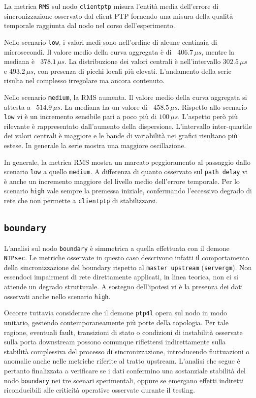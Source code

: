 La metrica \texttt{RMS} sul nodo \texttt{clientptp} misura l'entità media dell'errore
di sincronizzazione osservato dal client PTP fornendo una misura della qualità temporale
raggiunta dal nodo nel corso dell'esperimento.

Nello scenario \texttt{low}, i valori medi sono nell'ordine di alcune centinaia di
microsecondi. Il valore medio della curva aggregata è di ~$406.7\,\mu s$, mentre
la mediana è ~$378.1\,\mu s$. La distribuzione dei valori centrali è nell'intervallo
$3 02.5\,\mu s$ e $493.2\,\mu s$, con presenza di picchi locali più elevati.
L'andamento della serie risulta nel complesso irregolare ma ancora contenuto.

Nello scenario \texttt{medium}, la RMS aumenta. Il valore medio della curva aggregata
si attesta a ~$514.9\,\mu s$. La mediana ha un valore di ~$458.5\,\mu s$. Rispetto
allo scenario \texttt{low} vi è un incremento sensibile pari a poco più di
$100\,\mu s$. L'aspetto però più rilevante è rappresentato dall'aumento della dispersione.
L'intervallo inter-quartile dei valori centrali è maggiore e le bande di
variabilità nei grafici risultano più estese. In generale la serie mostra una maggiore
oscillazione.

In generale, la metrica RMS mostra un marcato peggioramento al passaggio dallo
scenario \texttt{low} a quello \texttt{medium}. A differenza di quanto osservato sul
\texttt{path delay} vi è anche un incremento maggiore del livello medio
dell'errore temporale. Per lo scenario \texttt{high} vale sempre la premessa
iniziale, confermando l'eccessivo degrado di rete che non permette a \texttt{clientptp}
di stabilizzarsi.

\subsection{\texttt{boundary}}
L'analisi sul nodo \texttt{boundary} è simmetrica a quella effettuata con il demone
\texttt{NTPsec}. Le metriche osservate in questo caso descrivono infatti il comportamento
della sincronizzazione del boundary rispetto al \texttt{master upstream} (\texttt{servergm}).
Non essendoci impairment di rete direttamente applicati, in linea teorica, non
ci si attende un degrado strutturale. A sostegno dell'ipotesi vi è la presenza dei
dati osservati anche nello scenario \texttt{high}.

Occorre tuttavia considerare che il demone \texttt{ptp4l} opera sul nodo in modo unitario,
gestendo contemporaneamente più porte della topologia. Per tale ragione,
eventuali fault, transizioni di stato o condizioni di instabilità osservate sulla
porta downstream possono comunque riflettersi indirettamente sulla stabilità complessiva
del processo di sincronizzazione, introducendo fluttuazioni o anomalie anche
nelle metriche riferite al tratto upstream. L'analisi che segue è pertanto finalizzata
a verificare se i dati confermino una sostanziale stabilità del nodo \texttt{boundary}
nei tre scenari sperimentali, oppure se emergano effetti indiretti riconducibili alle
criticità operative osservate durante il testing.

